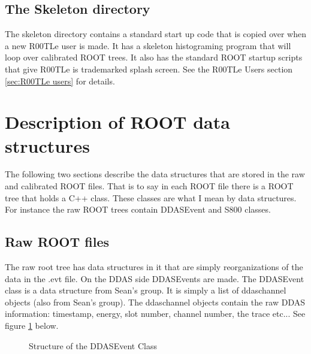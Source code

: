 \documentclass[paper=a4, fontsize=12pt]{scrartcl} %
\numberwithin{equation}{section} %
\numberwithin{figure}{section} %
\numberwithin{table}{section} %
\begin{document}
\label{sec:shell directory}

\subsection{The Skeleton directory}
The skeleton directory contains a standard start up code that is copied over when a new R00TLe user is made.  It has a skeleton histograming program that will loop over calibrated ROOT trees.  It also has the standard ROOT startup scripts that give R00TLe is trademarked splash screen.  See the R00TLe Users section \ref{sec:R00TLe users} for details.

\section{Description of ROOT data structures}
\label{sec:Data Structures}

The following two sections describe the data structures that are stored in the raw and calibrated ROOT files.  That is to say in each ROOT file there is a ROOT tree that holds a C++ class.  These classes are what I mean by data structures.  For instance the raw ROOT trees contain DDASEvent and S800 classes.

\subsection{Raw ROOT files}

The raw root tree has data structures in it that are simply reorganizations of the data in the .evt file.  On the DDAS side DDASEvents are made.  The DDASEvent class is a data structure from Sean's group.  It is simply a list of ddaschannel objects (also from Sean's group).  The ddaschannel objects contain the raw DDAS information: timestamp, energy, slot number, channel number, the trace etc...  See figure \ref{fig: DDASEventFig} below. \\

\begin{figure}[h]
\begin{center}
\end{center}
\caption{Structure of the DDASEvent Class}
\label{fig: DDASEventFig}
\end{figure}
\end{document}
